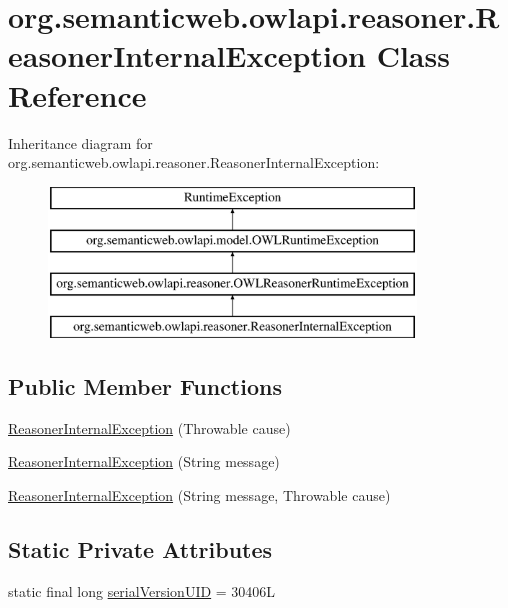 \hypertarget{classorg_1_1semanticweb_1_1owlapi_1_1reasoner_1_1_reasoner_internal_exception}{\section{org.\-semanticweb.\-owlapi.\-reasoner.\-Reasoner\-Internal\-Exception Class Reference}
\label{classorg_1_1semanticweb_1_1owlapi_1_1reasoner_1_1_reasoner_internal_exception}
}
Inheritance diagram for org.\-semanticweb.\-owlapi.\-reasoner.\-Reasoner\-Internal\-Exception\-:\begin{figure}[H]
\begin{center}
\leavevmode
\includegraphics[height=4.000000cm]{classorg_1_1semanticweb_1_1owlapi_1_1reasoner_1_1_reasoner_internal_exception}
\end{center}
\end{figure}
\subsection*{Public Member Functions}
\begin{DoxyCompactItemize}
\item 
\hyperlink{classorg_1_1semanticweb_1_1owlapi_1_1reasoner_1_1_reasoner_internal_exception_a94adcecf0c1788f5abdee5672cf8be83}{Reasoner\-Internal\-Exception} (Throwable cause)
\item 
\hyperlink{classorg_1_1semanticweb_1_1owlapi_1_1reasoner_1_1_reasoner_internal_exception_a8d52b4cecb5a732ceae21eec2fb02576}{Reasoner\-Internal\-Exception} (String message)
\item 
\hyperlink{classorg_1_1semanticweb_1_1owlapi_1_1reasoner_1_1_reasoner_internal_exception_ae44b6c331d81bda7770249632288f9b5}{Reasoner\-Internal\-Exception} (String message, Throwable cause)
\end{DoxyCompactItemize}
\subsection*{Static Private Attributes}
\begin{DoxyCompactItemize}
\item 
static final long \hyperlink{classorg_1_1semanticweb_1_1owlapi_1_1reasoner_1_1_reasoner_internal_exception_a284458fbe85b23f3709bb11cdf366692}{serial\-Version\-U\-I\-D} = 30406\-L
\end{DoxyCompactItemize}


